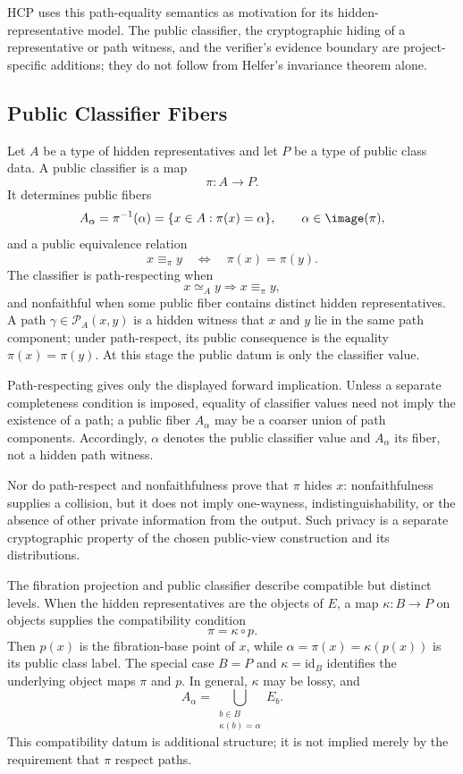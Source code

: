 HCP uses this path-equality semantics as motivation for its hidden-
representative model. The public classifier, the cryptographic hiding of a
representative or path witness, and the verifier's evidence boundary are
project-specific additions; they do not follow from Helfer's invariance
theorem alone.

\subsection{Public Classifier Fibers}

Let \(A\) be a type of hidden representatives and let \(P\) be a type of public
class data. A public classifier is a map
\[
  \pi:A\longrightarrow P.
\]
It determines public fibers
\[
  A_\alpha=\pi^{-1}(\alpha)=\{x\in A:\pi(x)=\alpha\},
  \qquad \alpha\in\image(\pi),
\]
and a public equivalence relation
\[
  x\equiv_{\pi}y
  \quad\Longleftrightarrow\quad
  \pi(x)=\pi(y).
\]
The classifier is path-respecting when
\[
  x\simeq_A y\Longrightarrow x\equiv_{\pi}y,
\]
and nonfaithful when some public fiber contains distinct hidden
representatives. A path \(\gamma\in\mathcal P_A(x,y)\) is a hidden witness
that \(x\) and \(y\) lie in the same path component; under path-respect, its
public consequence is the equality \(\pi(x)=\pi(y)\). At this stage the public
datum is only the classifier value.

Path-respecting gives only the displayed forward implication. Unless a
separate completeness condition is imposed, equality of classifier values
need not imply the existence of a path; a public fiber \(A_\alpha\) may be a
coarser union of path components. Accordingly, \(\alpha\) denotes the public
classifier value and \(A_\alpha\) its fiber, not a hidden path witness.

Nor do path-respect and nonfaithfulness prove that \(\pi\) hides \(x\):
nonfaithfulness supplies a collision, but it does not imply one-wayness,
indistinguishability, or the absence of other private information from the
output. Such privacy is a separate cryptographic property of the chosen
public-view construction and its distributions.

The fibration projection and public classifier describe compatible but
distinct levels. When the hidden representatives are the objects of \(E\), a
map \(\kappa:B\to P\) on objects supplies the compatibility condition
\[
  \pi=\kappa\circ p.
\]
Then \(p(x)\) is the fibration-base point of \(x\), while
\(\alpha=\pi(x)=\kappa(p(x))\) is its public class label. The special case
\(B=P\) and \(\kappa=\mathrm{id}_B\) identifies the underlying object maps
\(\pi\) and \(p\). In general, \(\kappa\) may be lossy, and
\[
  A_\alpha
  =\bigcup_{\substack{b\in B\\ \kappa(b)=\alpha}}E_b.
\]
This compatibility datum is additional structure; it is not implied merely by
the requirement that \(\pi\) respect paths.

